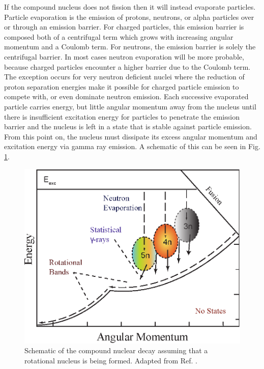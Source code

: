 If the compound nucleus does not fission then it will instead evaporate particles. Particle evaporation is the emission of protons, neutrons, or alpha particles over or through an emission barrier. For charged particles, this emission barrier is composed both of a centrifugal term which grows with increasing angular momentum and a Coulomb term. For neutrons, the emission barrier is solely the centrifugal barrier. In most cases neutron evaporation will be more probable, because charged particles encounter a higher barrier due to the Coulomb term. The exception occurs for very neutron deficient nuclei where the reduction of proton separation energies make it possible for charged particle emission to compete with, or even dominate neutron emission. Each successive evaporated particle carries energy, but little angular momentum away from the nucleus until there is insufficient excitation energy for particles to penetrate the emission barrier and the nucleus is left in a state that is stable against particle emission. From this point on, the nucleus must dissipate its excess angular momentum and excitation energy via gamma ray emission. A schematic of this can be seen in Fig. \ref{fig:chp3-emission-schematic}.

\begin{figure}[h!]
	\centerline{\includegraphics[height=0.3\textheight]{./img/c3/evaporation_chans.eps}}
	\caption{Schematic of the compound nuclear decay assuming that a rotational nucleus is being formed. Adapted from Ref. \cite{danielDissertation}.}
	\label{fig:chp3-emission-schematic}
\end{figure}

